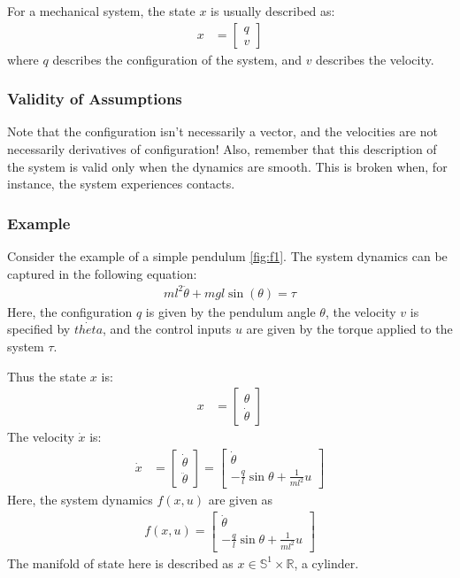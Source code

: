 \noindent
For a mechanical system, the state $x$ is usually described as:
\begin{align}
    x &= \begin{bmatrix}
            q \\
            v
        \end{bmatrix}
\end{align}
where $q$ describes the configuration of the system, and $v$ describes the velocity. 

\subsubsection{Validity of Assumptions}
Note that the configuration isn't necessarily a vector, and the velocities are not necessarily derivatives of configuration! Also, remember that this description of the system is valid only when the dynamics are smooth. This is broken when, for instance, the system experiences contacts. 

\subsubsection{Example}
Consider the example of a simple pendulum \cref{fig:f1}. The system dynamics can be captured in the following equation: 
\begin{align}
    m l^2 \ddot{\theta} + m g l \sin(\theta) = \tau
\end{align}
Here, the configuration $q$ is given by the pendulum angle $\theta$, the velocity $v$ is specified by $\dot{theta}$, and the control inputs $u$ are given by the torque applied to the system $\tau$.

\noindent
Thus the state $x$ is: 
\begin{align}
    x &= \begin{bmatrix}
            \theta \\
            \dot{\theta} 
        \end{bmatrix}
\end{align} 
The velocity $\dot{x}$ is:
\begin{align}
    \dot{x} &= \begin{bmatrix} 
            \dot{\theta}  \\
            \ddot{\theta} 
        \end{bmatrix}
        = 
        \begin{bmatrix}
            \dot{\theta} \\
            -\frac{q}{l} \sin{\theta} + \frac{1}{m l^2} u
        \end{bmatrix}
\end{align} 
Here, the system dynamics $f(x,u)$ are given as 
\begin{align}
    f(x,u) = 
        \begin{bmatrix}
            \dot{\theta} \\
            -\frac{q}{l} \sin{\theta} + \frac{1}{m l^2} u
        \end{bmatrix}
\end{align} 
The manifold of state here is described as $x \in \mathbb{S}^1 \times \mathbb{R}$, a cylinder.

